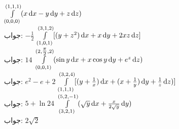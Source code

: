 \quad
$\int\limits_{(0,0,0)}^{(1,1,1)} (x\dif x-y\dif y+z\dif z)$\\
جواب:\quad
$-\tfrac{1}{2}$
\quad
$\int\limits_{(1,0,1)}^{(3,1,2)} [(y+z^2)\dif x+x\dif y+2xz\dif z]$\\
جواب:\quad
$14$
\quad
$\int\limits_{(0,0,1)}^{(2,\tfrac{\pi}{2},2)} (\sin y \dif x+x\cos y\dif y+e^z\dif z)$\\
جواب:\quad
$e^2-e+2$
\quad
$\int\limits_{(1,1,1)}^{(3,2,4)} [(y+\frac{1}{x}) \dif x+(x+\frac{1}{y})\dif y+\frac{1}{z}\dif z)]$\\
جواب:\quad
$5+\ln 24$
\quad
$\int\limits_{(3,2,1)}^{(5,2,-1)} (\sqrt{y}\dif x+\frac{x}{2\sqrt{y}}\dif y)$\\
جواب:\quad
$2\sqrt{2}$

